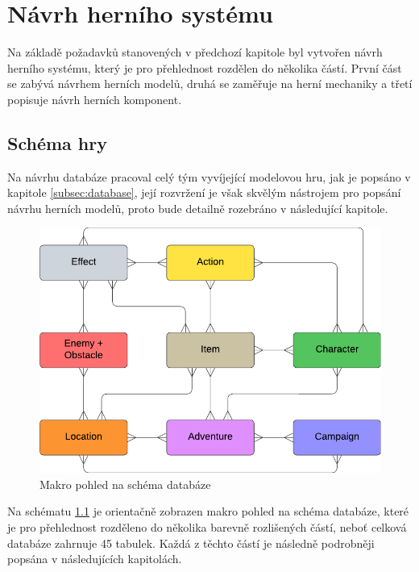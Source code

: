 \chapter{Návrh herního systému}
\label{chap:design}

Na základě požadavků stanovených v předchozí kapitole byl vytvořen návrh herního systému, který je pro přehlednost rozdělen do několika částí. První část se zabývá návrhem herních modelů, druhá se zaměřuje na herní mechaniky a třetí popisuje návrh herních komponent.


\section{Schéma hry}
\label{sec:design_scheme}

Na návrhu databáze pracoval celý tým vyvíjející modelovou hru, jak je popsáno v kapitole \ref{subsec:database}, její rozvržení je však skvělým nástrojem pro popsání návrhu herních modelů, proto bude detailně rozebráno v následující kapitole.

\begin{figure}[h]
    \centering
    \includegraphics[scale=0.95]{../../shared/diagrams/er_macro.pdf}
    \caption{Makro pohled na schéma databáze}
    \label{diag:er_macro}
\end{figure}

Na schématu \ref{diag:er_macro} je orientačně zobrazen makro pohled na schéma databáze, které je pro přehlednost rozděleno do několika barevně rozlišených částí, neboť celková databáze zahrnuje 45 tabulek. Každá z těchto částí je následně podrobněji popsána v následujících kapitolách.


